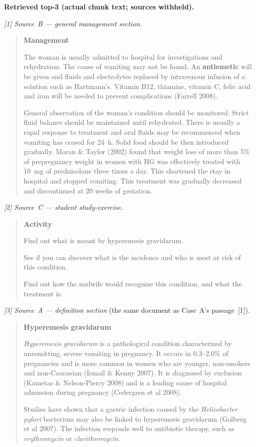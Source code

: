 \smallskip
\noindent\textbf{Retrieved top-3 (actual chunk text; sources withheld).}

\smallskip
\noindent\emph{[1] Source~B --- general management section.}
\begin{quote}\footnotesize
\textbf{Management}

The woman is usually admitted to hospital for investigations and rehydration.
The cause of vomiting may not be found. An \textbf{antiemetic} will be given and
fluids and electrolytes replaced by intravenous infusion of a solution such as
Hartmann's. Vitamin B12, thiamine, vitamin C, folic acid and iron will be needed
to prevent complications (Farrell 2008).

General observation of the woman's condition should be monitored. Strict fluid
balance should be maintained until rehydrated. There is usually a rapid response
to treatment and oral fluids may be recommenced when vomiting has ceased for
24~h. Solid food should be then introduced gradually. Moran \& Taylor (2002)
found that weight loss of more than 5\% of prepregnancy weight in women with HG
was effectively treated with 10~mg of prednisolone three times a day. This
shortened the stay in hospital and stopped vomiting. This treatment was
gradually decreased and discontinued at 20 weeks of gestation.
\end{quote}

\noindent\emph{[2] Source~C --- student study-exercise.}
\begin{quote}\footnotesize
\textbf{Activity}

Find out what is meant by hyperemesis gravidarum.

See if you can discover what is the incidence and who is most at risk of this
condition.

Find out how the midwife would recognize this condition, and what the treatment
is.
\end{quote}

\noindent\emph{[3] Source~A --- definition section} (the same document as
Case~A's passage~[1]).
\begin{quote}\footnotesize
\textbf{Hyperemesis gravidarum}

\emph{Hyperemesis gravidarum} is a pathological condition characterized by
unremitting, severe vomiting in pregnancy. It occurs in 0.3--2.0\% of
pregnancies and is more common in women who are younger, non-smokers and
non-Caucasian (Ismail \& Kenny 2007). It is diagnosed by exclusion (Kametas \&
Nelson-Piercy 2008) and is a leading cause of hospital admission during
pregnancy (Cedergren et al 2008).

Studies have shown that a gastric infection caused by the \emph{Helicobacter
pylori} bacterium may also be linked to hyperemesis gravidarum (Golberg et al
2007). The infection responds well to antibiotic therapy, such as
\emph{erythromycin} or \emph{clarithromycin}.
\end{quote}

